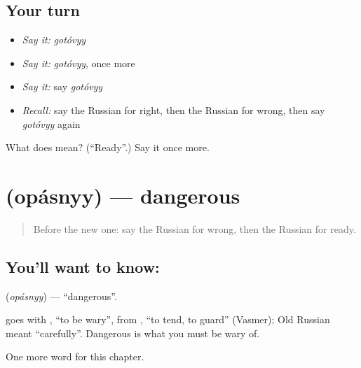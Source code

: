 \subsection*{Your turn}
\begin{itemize}
\raggedright
  \item \emph{Say it:} \emph{gotóvyy}
  \item \emph{Say it:} \emph{gotóvyy}, once more
  \item \emph{Say it:} say \emph{gotóvyy}
  \item \emph{Recall:} say the Russian for right, then the Russian for wrong, then say \emph{gotóvyy} again
\end{itemize}

\begin{tcolorbox}[breakable,colback=teal!4,colframe=teal!35!black,title={Before you move on}]
What does  mean? (\textquotedblleft{}Ready\textquotedblright{}.) Say it once more.
\end{tcolorbox}
\section[\texorpdfstring{\ru{опасный} (opásnyy)}{опасный (opásnyy)}]{ (opásnyy) — dangerous}

\label{lesson:RU-C128-dangerous}



\begin{quote}
Before the new one: say the Russian for wrong, then the Russian for ready.
\end{quote}

\subsection*{You'll want to know: }
\textbf{} (\emph{opásnyy}) — \textquotedblleft{}dangerous\textquotedblright{}.

\begin{cousinweb}
\textbf{} goes with \emph{}, \textquotedblleft{}to be wary\textquotedblright{}, from \emph{}, \textquotedblleft{}to tend, to guard\textquotedblright{} (Vasmer); Old Russian \emph{} meant \textquotedblleft{}carefully\textquotedblright{}. Dangerous is what you must be wary of.
\end{cousinweb}

\begin{grammarlens}[title={What you've built}]
One more word for this chapter.
\end{grammarlens}

